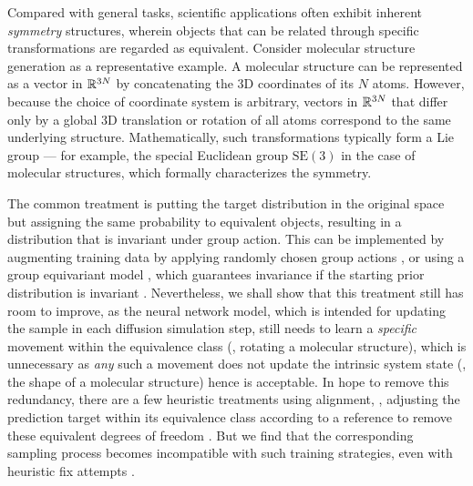 \documentclass{article} %
\newcommand{\SE}{\mathrm{SE}}
\begin{document}
Compared with general tasks,
scientific applications often exhibit inherent \emph{symmetry} structures, wherein objects that can be related through specific transformations are regarded as equivalent.
Consider molecular structure generation as a representative example. A molecular structure can be represented as a vector in $\mathbb{R}^{3N}$ by concatenating the 3D coordinates of its $N$ atoms. However, because the choice of coordinate system is arbitrary, vectors in $\mathbb{R}^{3N}$ that differ only by a global 3D translation or rotation of all atoms correspond to the same underlying structure. Mathematically, such transformations typically form a Lie group — for example, the special Euclidean group $\SE(3)$ in the case of molecular structures, which formally characterizes the symmetry.

The common treatment 
is putting the target distribution in the original space but assigning the same probability to equivalent objects, resulting in a distribution that is invariant under group action.
This can be implemented by augmenting training data by applying randomly chosen group actions \citep{abramson2024accurate}, or using a group equivariant model \citep{xu2022geodiff,hoogeboom22equivariant}, which guarantees invariance if the starting prior distribution is invariant \citep{kohler2020equivariant}.
Nevertheless, we shall show that this treatment still has room to improve, 
as the neural network model, which is intended for updating the sample in each diffusion simulation step, still needs to learn a \emph{specific} movement within the equivalence class (\eg, rotating a molecular structure), which is unnecessary as \emph{any} such a movement does not update the intrinsic system state (\eg, the shape of a molecular structure) hence is acceptable.
In hope to remove this redundancy, there are a few heuristic treatments using alignment, \ie, adjusting the prediction target within its equivalence class 
according to a reference to remove these equivalent degrees of freedom \citep{xu2022geodiff,abramson2024accurate}. 
But we find that the corresponding sampling process becomes incompatible with such training strategies, even with heuristic fix attempts \citep{wohlwend2025boltz}.
\end{document}
